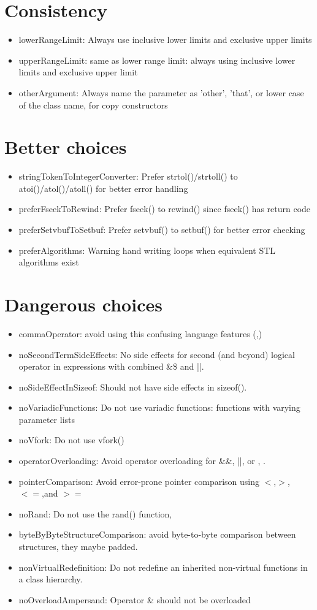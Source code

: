 \section{Consistency}
\begin{itemize}
\item lowerRangeLimit: Always use inclusive lower limits and exclusive upper limits
\item upperRangeLimit: same as lower range limit: always using inclusive lower limits and exclusive upper limit
\item otherArgument: Always name the parameter as 'other', 'that', or lower case of the class name, for copy constructors
\end{itemize}

\section{Better choices}
\begin{itemize}
\item stringTokenToIntegerConverter: Prefer strtol()/strtoll() to atoi()/atol()/atoll() for better error handling
\item preferFseekToRewind: Prefer fseek() to rewind() since fseek() has return code
\item preferSetvbufToSetbuf: Prefer setvbuf() to setbuf() for better error checking
\item preferAlgorithms: Warning hand writing loops when equivalent STL algorithms exist
\end{itemize}

\section{Dangerous choices}
\begin{itemize}
\item commaOperator: avoid using this confusing language features (,)
\item noSecondTermSideEffects: No side effects for second (and beyond)
logical operator in expressions with combined \&\$ and ||. 
\item noSideEffectInSizeof: Should not have side effects in sizeof(). 
\item noVariadicFunctions: Do not use variadic functions: functions with varying parameter lists
\item noVfork: Do not use vfork()
\item operatorOverloading: Avoid operator overloading for \&\&, ||, or , . 
\item pointerComparison: Avoid error-prone pointer comparison using
$<$,$>$, $<=$,and $>=$
\item noRand: Do not use the rand() function, 
\item byteByByteStructureComparison: avoid byte-to-byte comparison between structures, they maybe padded.
\item nonVirtualRedefinition: Do not redefine an inherited non-virtual functions in a class hierarchy.
\item noOverloadAmpersand: Operator \& should not be overloaded
\end{itemize}

